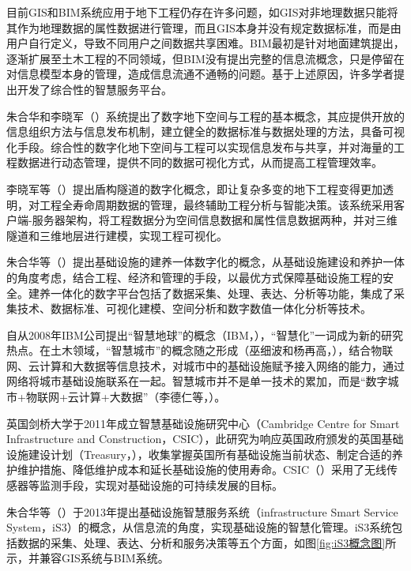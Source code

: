 目前GIS和BIM系统应用于地下工程仍存在许多问题，如GIS对非地理数据只能将其作为地理数据的属性数据进行管理，而且GIS本身并没有规定数据标准，而是由用户自行定义，导致不同用户之间数据共享困难。BIM最初是针对地面建筑提出，逐渐扩展至土木工程的不同领域，但BIM没有提出完整的信息流概念，只是停留在对信息模型本身的管理，造成信息流通不通畅的问题。基于上述原因，许多学者提出开发了综合性的智慧服务平台。

朱合华和李晓军（\citeyear{朱合华2007数字地下空间与工程}）系统提出了数字地下空间与工程的基本概念，其应提供开放的信息组织方法与信息发布机制，建立健全的数据标准与数据处理的方法，具备可视化手段。综合性的数字化地下空间与工程可以实现信息发布与共享，并对海量的工程数据进行动态管理，提供不同的数据可视化方式，从而提高工程管理效率。

李晓军等（\citeyear{李晓军2009盾构隧道数字化研究与应用}）提出盾构隧道的数字化概念，即让复杂多变的地下工程变得更加透明，对工程全寿命周期数据的管理，最终辅助工程分析与智能决策。该系统采用客户端-服务器架构，将工程数据分为空间信息数据和属性信息数据两种，并对三维隧道和三维地层进行建模，实现工程可视化。

朱合华等（\citeyear{朱合华2015基础设施建养一体数字化技术}）提出基础设施的建养一体数字化的概念，从基础设施建设和养护一体的角度考虑，结合工程、经济和管理的手段，以最优方式保障基础设施工程的安全。建养一体化的数字平台包括了数据采集、处理、表达、分析等功能，集成了采集技术、数据标准、可视化建模、空间分析和数字数值一体化分析等技术。

自从2008年IBM公司提出“智慧地球”的概念（IBM，\citeyear{IBM2008Wisdom}），“智慧化”一词成为新的研究热点。在土木领域，“智慧城市”的概念随之形成（巫细波和杨再高，\citeyear{巫细波2010智慧城市理念与未来城市发展}），结合物联网、云计算和大数据等信息技术，对城市中的基础设施赋予接入网络的能力，通过网络将城市基础设施联系在一起。智慧城市并不是单一技术的累加，而是“数字城市+物联网+云计算+大数据”（李德仁等，\citeyear{李德仁2013智慧城市的概念}）。

英国剑桥大学于2011年成立智慧基础设施研究中心（Cambridge Centre for Smart Infrastructure and Construction，CSIC），此研究为响应英国政府颁发的英国基础设施建设计划（Treasury，\citeyear{treasury2011national}），收集掌握英国所有基础设施当前状态、制定合适的养护维护措施、降低维护成本和延长基础设施的使用寿命。CSIC（\citeyear{CSIC2011Cambridge}）采用了无线传感器等监测手段，实现对基础设施的可持续发展的目标。

朱合华等（\citeyear{朱合华2018智慧基础设施}）于2013年提出基础设施智慧服务系统（infrastructure Smart Service System，iS3）的概念，从信息流的角度，实现基础设施的智慧化管理。iS3系统包括数据的采集、处理、表达、分析和服务决策等五个方面，如图\ref{fig:iS3概念图}所示，并兼容GIS系统与BIM系统。

